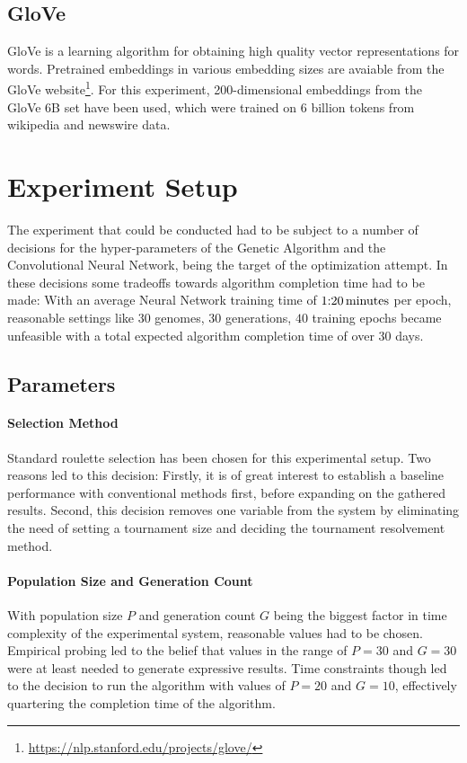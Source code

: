 \documentclass[11pt,a4paper,twoside,openright]{scrbook}
\begin{document}
\subsection{GloVe}
GloVe is a learning algorithm for obtaining high quality vector representations for words. Pretrained embeddings in various embedding sizes are avaiable from the GloVe website\footnote{\url{https://nlp.stanford.edu/projects/glove/}}. For this experiment, 200-dimensional embeddings from the GloVe 6B set have been used, which were trained on 6 billion tokens from wikipedia and newswire data.

\section{Experiment Setup}

The experiment that could be conducted had to be subject to a number of decisions for the hyper-parameters of the Genetic Algorithm and the Convolutional Neural Network, being the target of the optimization attempt. In these decisions some tradeoffs towards algorithm completion time had to be made: With an average Neural Network training time of \(1\text{:}20\text{\,minutes}\) per epoch, reasonable settings like \(30\) genomes, \(30\) generations, \(40\) training epochs became unfeasible with a total expected algorithm completion time of over \(30\) days.

\subsection{Parameters}

\paragraph{Selection Method} Standard roulette selection has been chosen for this experimental setup. Two reasons led to this decision: Firstly, it is of great interest to establish a baseline performance with conventional methods first, before expanding on the gathered results. Second, this decision removes one variable from the system by eliminating the need of setting a tournament size and deciding the tournament resolvement method.

\paragraph{Population Size and Generation Count} With population size \(P\) and generation count \(G\) being the biggest factor in time complexity of the experimental system, reasonable values had to be chosen. Empirical probing led to the belief that values in the range of \(P=30\) and \(G=30\) were at least needed to generate expressive results. Time constraints though led to the decision to run the algorithm with values of \(P=20\) and \(G=10\), effectively quartering the completion time of the algorithm.
\end{document}
